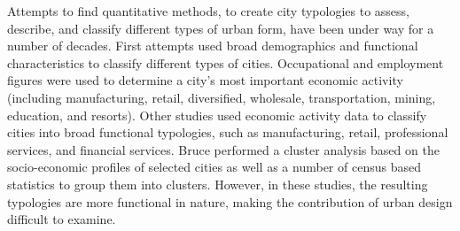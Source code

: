 \documentclass{nature}
\begin{document}
Attempts to find quantitative methods, to create city typologies to assess, describe, and classify different types of urban form, have been under way for a number of decades. First attempts used broad demographics and functional characteristics to classify different types of cities. Occupational and employment figures were used to determine a city's most important economic activity (including manufacturing, retail, diversified, wholesale, transportation, mining, education, and resorts)\cite{Harris1943}. Other studies used economic activity data to classify cities into broad functional typologies, such as manufacturing, retail, professional services, and financial services\cite{Nelson1955}. Bruce\cite{Bruce1971} performed a cluster analysis based on the socio-economic profiles of selected cities as well as a number of census based statistics to group them into clusters. However, in these studies, the resulting typologies are more functional in nature, making the contribution of urban design difficult to examine.
\end{document}
